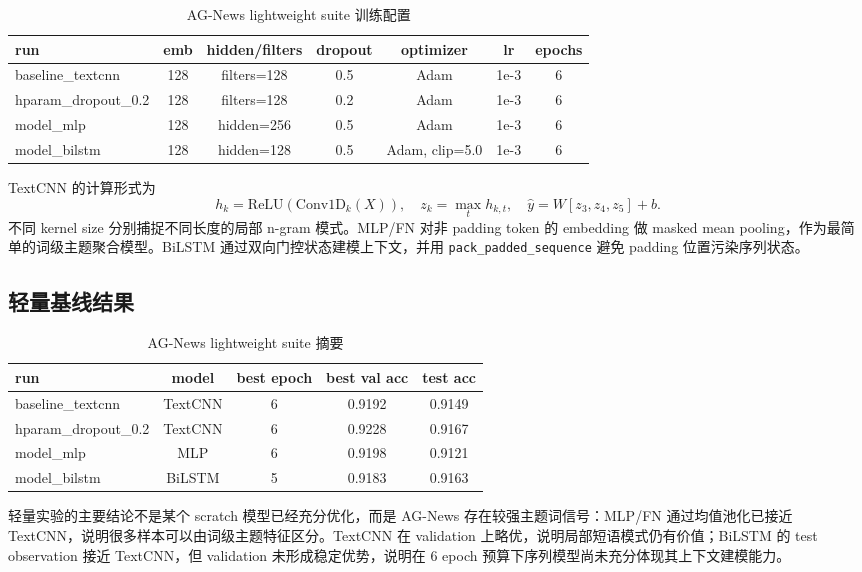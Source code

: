\documentclass[UTF8,a4paper,11pt]{ctexart}
\begin{document}
\begin{table}[H]
\centering
\caption{AG-News lightweight suite 训练配置}
\small
\begin{tabular}{lcccccc}
\toprule
run & emb & hidden/filters & dropout & optimizer & lr & epochs \\
\midrule
baseline\_textcnn & 128 & filters=128 & 0.5 & Adam & 1e-3 & 6 \\
hparam\_dropout\_0.2 & 128 & filters=128 & 0.2 & Adam & 1e-3 & 6 \\
model\_mlp & 128 & hidden=256 & 0.5 & Adam & 1e-3 & 6 \\
model\_bilstm & 128 & hidden=128 & 0.5 & Adam, clip=5.0 & 1e-3 & 6 \\
\bottomrule
\end{tabular}
\end{table}

TextCNN 的计算形式为
\[
h_k = \mathrm{ReLU}(\mathrm{Conv1D}_k(X)), \quad
z_k = \max_t h_{k,t}, \quad
\hat{y}=W[z_3,z_4,z_5]+b.
\]
不同 kernel size 分别捕捉不同长度的局部 n-gram 模式。MLP/FN 对非 padding token 的 embedding 做 masked mean pooling，作为最简单的词级主题聚合模型。BiLSTM 通过双向门控状态建模上下文，并用 \texttt{pack\_padded\_sequence} 避免 padding 位置污染序列状态。

\subsection{轻量基线结果}
\begin{table}[H]
\centering
\caption{AG-News lightweight suite 摘要}
\begin{tabular}{lcccc}
\toprule
run & model & best epoch & best val acc & test acc \\
\midrule
baseline\_textcnn & TextCNN & 6 & 0.9192 & 0.9149 \\
hparam\_dropout\_0.2 & TextCNN & 6 & 0.9228 & 0.9167 \\
model\_mlp & MLP & 6 & 0.9198 & 0.9121 \\
model\_bilstm & BiLSTM & 5 & 0.9183 & 0.9163 \\
\bottomrule
\end{tabular}
\end{table}

轻量实验的主要结论不是某个 scratch 模型已经充分优化，而是 AG-News 存在较强主题词信号：MLP/FN 通过均值池化已接近 TextCNN，说明很多样本可以由词级主题特征区分。TextCNN 在 validation 上略优，说明局部短语模式仍有价值；BiLSTM 的 test observation 接近 TextCNN，但 validation 未形成稳定优势，说明在 6 epoch 预算下序列模型尚未充分体现其上下文建模能力。
\end{document}
